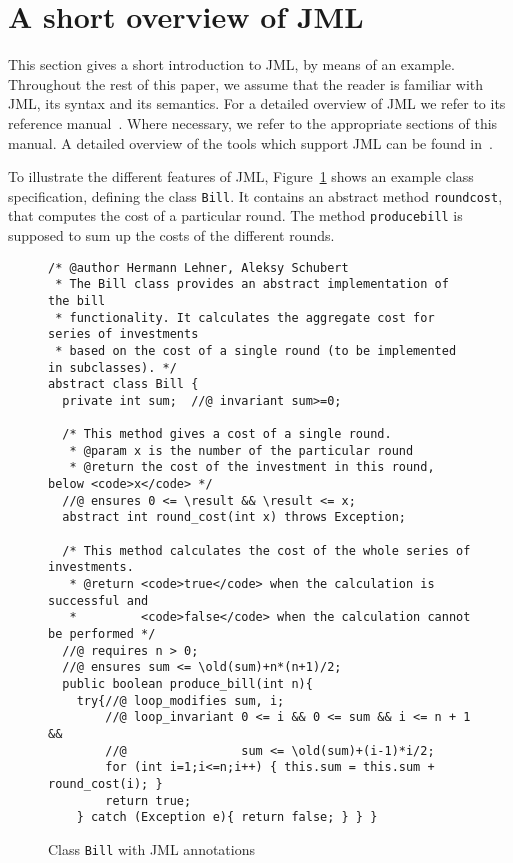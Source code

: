 \section{A short overview of JML}\label{SecJMLOverview}

This section gives a short introduction to JML, by means of an
example. Throughout the rest of this paper, we assume that the
reader is familiar with JML, its syntax and its semantics. For a
detailed overview of JML we refer to its reference
manual~\cite{JMLReferenceManual05}. Where necessary, we refer to the
appropriate sections of this manual. A detailed overview of the tools
which support JML can be found in~\cite{BurdyCCEKLLP05}.


To illustrate the different features of JML, Figure~\ref{FigJMLSpec}
shows an example class specification, defining the class
\texttt{Bill}. It contains an abstract method
\texttt{round\unsc cost}, that computes the cost of a particular
round. The method \texttt{produce\unsc bill} is supposed to sum up the
costs of the different rounds. 

\begin{figure}[th!]
{\small
\begin{verbatim}
/* @author Hermann Lehner, Aleksy Schubert
 * The Bill class provides an abstract implementation of the bill 
 * functionality. It calculates the aggregate cost for series of investments
 * based on the cost of a single round (to be implemented in subclasses). */
abstract class Bill {
  private int sum;  //@ invariant sum>=0;
 
  /* This method gives a cost of a single round.
   * @param x is the number of the particular round
   * @return the cost of the investment in this round, below <code>x</code> */
  //@ ensures 0 <= \result && \result <= x;
  abstract int round_cost(int x) throws Exception;
  
  /* This method calculates the cost of the whole series of investments.
   * @return <code>true</code> when the calculation is successful and
   *         <code>false</code> when the calculation cannot be performed */
  //@ requires n > 0;
  //@ ensures sum <= \old(sum)+n*(n+1)/2;
  public boolean produce_bill(int n){
    try{//@ loop_modifies sum, i;
        //@ loop_invariant 0 <= i && 0 <= sum && i <= n + 1 && 
        //@                sum <= \old(sum)+(i-1)*i/2;
        for (int i=1;i<=n;i++) { this.sum = this.sum + round_cost(i); }
        return true;
    } catch (Exception e){ return false; } } }
\end{verbatim}
}
\vspace*{-1em}\caption{Class \texttt{Bill} with JML annotations} 
\label{FigJMLSpec}
\end{figure}


